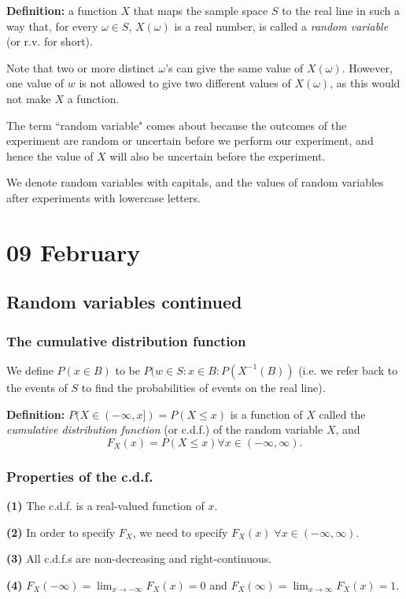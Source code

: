 \documentclass[12pt]{article}
\begin{document}
\textbf{Definition:} a function $X$ that maps the sample space $S$ to the real line in such a way that, for every $\omega \in S$, $X(\omega)$ is a real number, is called a \emph{random variable} (or r.v. for short). 

Note that two or more distinct $\omega$'s can give the same value of $X(\omega)$. However, one value of $w$ is not allowed to give two different values of $X(\omega)$, as this would not make $X$ a function.

The term ``random variable" comes about because the outcomes of the experiment are random or uncertain before we perform our experiment, and hence the value of $X$ will also be uncertain before the experiment.

We denote random variables with capitals, and the values of random variables after experiments with lowercase letters.

\section{09 February}
\subsection{Random variables continued}
\subsubsection{The cumulative distribution function}
We define $P(x \in B)$ to be $P(w \in S : x \in B : P(X^{-1} (B))$ (i.e. we refer back to the events of $S$ to find the probabilities of events on the real line).

\textbf{Definition:} $P(X \in (-\infty, x]) = P(X \leq x)$ is a function of $X$ called the \emph{cumulative distribution function} (or c.d.f.) of the random variable $X$, and
\[
    F_X (x) = P(X \leq x) \forall x \in (-\infty, \infty).
\]

\subsubsection{Properties of the c.d.f.}
\textbf{(1)} The c.d.f. is a real-valued function of $x$.

\textbf{(2)} In order to specify $F_X$, we need to specify $F_X (x) \; \forall x \in (-\infty, \infty)$.

\textbf{(3)} All c.d.f.s are non-decreasing and right-continuous.

\textbf{(4)} $F_X (-\infty) = \lim_{x \to -\infty} F_X (x) = 0$ and $F_X (\infty) = \lim_{x \to \infty} F_X (x) = 1$.
\end{document}
